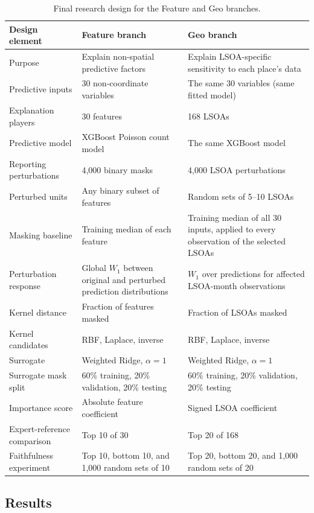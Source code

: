 \begin{table}[H]
\centering
\caption{Final research design for the Feature and Geo branches.}
\label{tab:hull_research_design}
\small
\begin{tabularx}{\textwidth}{p{} X X}
\toprule
Design element & Feature branch & Geo branch \\
\midrule
Purpose & Explain non-spatial predictive factors & Explain LSOA-specific sensitivity to each place's data \\
Predictive inputs & 30 non-coordinate variables & The same 30 variables (same fitted model) \\
Explanation players & 30 features & 168 LSOAs \\
Predictive model & XGBoost Poisson count model & The same XGBoost model \\
Reporting perturbations & 4,000 binary masks & 4,000 LSOA perturbations \\
Perturbed units & Any binary subset of features & Random sets of 5--10 LSOAs \\
Masking baseline & Training median of each feature & Training median of all 30 inputs, applied to every observation of the selected LSOAs \\
Perturbation response & Global $W_1$ between original and perturbed prediction distributions & $W_1$ over predictions for affected LSOA-month observations \\
Kernel distance & Fraction of features masked & Fraction of LSOAs masked \\
Kernel candidates & RBF, Laplace, inverse & RBF, Laplace, inverse \\
Surrogate & Weighted Ridge, $\alpha=1$ & Weighted Ridge, $\alpha=1$ \\
Surrogate mask split & 60\% training, 20\% validation, 20\% testing & 60\% training, 20\% validation, 20\% testing \\
Importance score & Absolute feature coefficient & Signed LSOA coefficient \\
Expert-reference comparison & Top 10 of 30 & Top 20 of 168 \\
Faithfulness experiment & Top 10, bottom 10, and 1,000 random sets of 10 & Top 20, bottom 20, and 1,000 random sets of 20 \\
\bottomrule
\end{tabularx}
\end{table}

\subsection{Results}
\label{sec:hull_results}

